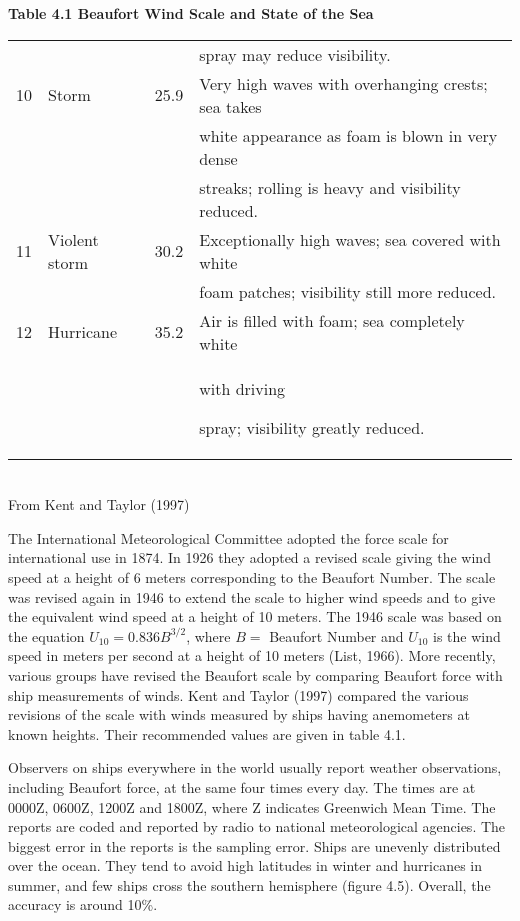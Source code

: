 \begin{table}[t!] {\textbf{\footnotesize{Table 4.1 Beaufort Wind Scale and State of the Sea}}}
\begin{footnotesize}
\begin{tabular}{@{}clrp{70mm}@{}}
\\
\ &\ &\ & \hspace{1em}spray may reduce visibility. \\
10 &    Storm &     25.9  & Very high waves with overhanging crests; sea takes \\
\ &\ &\ & \hspace{1em}white appearance as foam is blown in very dense \\
\ &\ &\ & \hspace{1em}streaks; rolling is heavy and visibility reduced. \\
11 &    Violent storm & 30.2  & Exceptionally high waves; sea covered with white \\
\ &\ &\ & \hspace{1em}foam patches; visibility still more reduced.  \\
12 &    Hurricane & 35.2  & Air is filled with foam; sea completely white\\
\ &\ &\ &  \hspace{1em}with driving  \rule[-2.5ex]{0ex}{0.5ex}spray;
visibility greatly reduced.\\
\hline
\end{tabular} \\[0.5ex]
From Kent and Taylor (1997)
\end{footnotesize}
\vspace{-4ex}
\end{table}

The International Meteorological Committee adopted the force scale for
international use in 1874. In 1926 they adopted a revised scale giving
the wind speed at a height of 6 meters corresponding to the Beaufort Number. The
scale was revised again in 1946 to extend the scale to higher wind speeds and to
give the equivalent wind speed at a height of 10 meters. The 1946 scale was based
on the equation $U_{10} = 0.836 B^{3/2}$, where $B = $ Beaufort Number
and $U_{10}$ is the wind speed in meters per second at a height of 10 meters
(List, 1966). More recently, various groups have revised the Beaufort
scale by comparing Beaufort force with ship measurements of winds. Kent and
Taylor (1997) compared the various revisions of the scale with winds
measured by ships having anemometers at known heights. Their recommended values
are given in table 4.1.

Observers on ships everywhere in the world usually report weather observations,
including Beaufort force, at the same four times every day. The times are at 0000Z,
0600Z, 1200Z and 1800Z, where Z indicates Greenwich Mean Time. The reports are coded
and reported by radio to national meteorological agencies. The biggest error in
the reports is the sampling error. Ships are unevenly distributed over
the ocean. They tend to avoid high latitudes in winter and hurricanes in summer, and few
ships cross the southern hemisphere (figure 4.5). Overall, the
accuracy is around 10\%.



